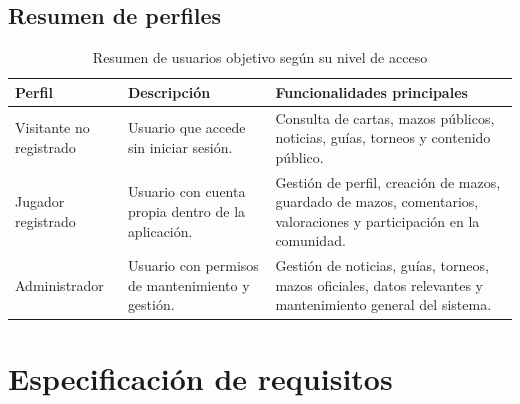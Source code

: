 \documentclass[10pt]{article}
\begin{document}
    \subsection{Resumen de perfiles}
        \begin{table}[H]
            \centering
            \renewcommand{\arraystretch}{1.3}
            \begin{tabular}{|p{3.5cm}|p{5cm}|p{5.5cm}|}
                \hline
                \textbf{Perfil} & \textbf{Descripción} & \textbf{Funcionalidades principales} \\
                \hline
                    Visitante no registrado & Usuario que accede sin iniciar sesión. & Consulta de cartas, mazos públicos, noticias, guías, torneos y contenido público. \\
                \hline
                    Jugador registrado & Usuario con cuenta propia dentro de la aplicación. & Gestión de perfil, creación de mazos, guardado de mazos, comentarios, valoraciones y participación en la comunidad. \\
                \hline
                    Administrador & Usuario con permisos de mantenimiento y gestión. & Gestión de noticias, guías, torneos, mazos oficiales, datos relevantes y mantenimiento general del sistema. \\
                \hline
            \end{tabular}
            \caption{Resumen de usuarios objetivo según su nivel de acceso}
        \end{table}

    
	
	\section{Especificación de requisitos}
		
\end{document}
